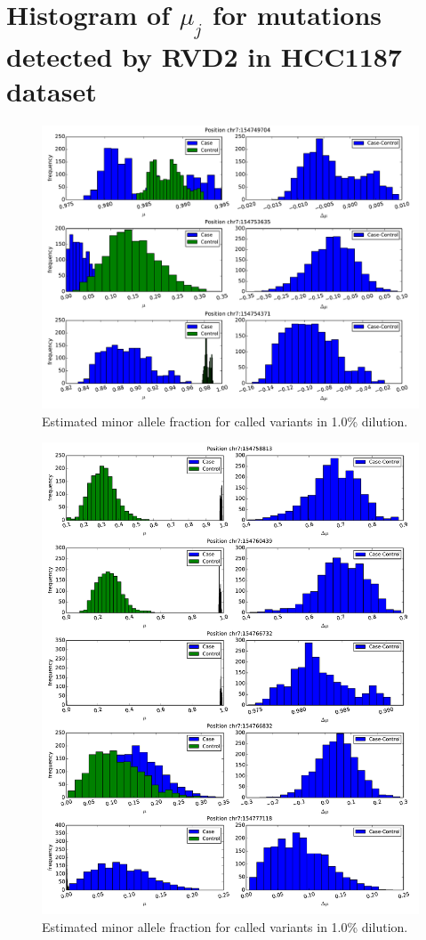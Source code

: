 \documentclass[11pt,reqno]{amsart}
\begin{document}
\section{Histogram of $ \mu_j $ for mutations detected by RVD2 in HCC1187 dataset}
\begin{figure}[H]
\begin{center}
\includegraphics[width=120mm]{pdf_figs/HCC1187_histogram_neg.pdf}
\caption{Estimated minor allele fraction for called variants in 1.0\% dilution.}
\label{fig:hist_neg}
\end{center}
\end{figure}

\begin{figure}[H]
\begin{center}
\includegraphics[width=120mm]{pdf_figs/HCC1187_histogram_pos.pdf}
\caption{Estimated minor allele fraction for called variants in 1.0\% dilution.}
\label{fig:hist_pos}
\end{center}
\end{figure}
\end{document}

